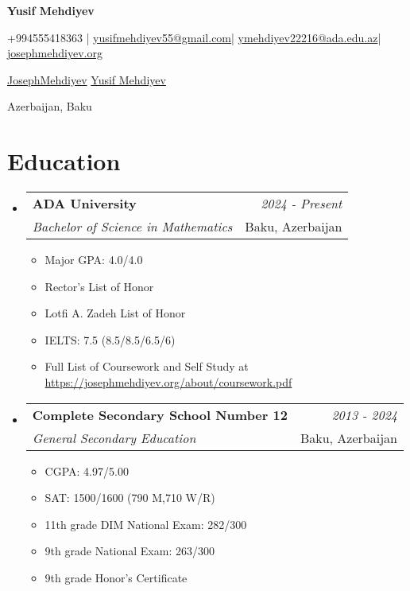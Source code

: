 \documentclass[a4paper,11pt]{article}
\makeatletter
\newcommand{\resumeSubheading}[4]{
    \vspace{0.5mm}
\item
    \begin{tabular*}{0.98\textwidth}[t]{l@{\extracolsep{\fill}}r}
        \textbf{#1} & \textit{\footnotesize{#4}} \\
        \textit{\footnotesize{#3}} &  \footnotesize{#2}\\
    \end{tabular*}
    \vspace{-2.4mm}
}
\newcommand{\resumeSubHeadingListStart}{
\begin{itemize}[leftmargin=*,labelsep=1mm]}
\newcommand{\resumeItemListStart}{
                \begin{itemize}[leftmargin=*,labelsep=1mm,itemsep=0.5mm]}
\newcommand{\resumeSubHeadingListEnd}{
                    \end{itemize}\vspace{2mm}}
\newcommand{\resumeItemListEnd}{
    \end{itemize}\vspace{-2mm}}
\newcommand{\socialicon}[1]{\raisebox{-0.05em}{\resizebox{!}{1em}{#1}}}
\newcommand{\headerfontiii}{\fontfamily{ppl}\selectfont} %
\makeatother
\begin{document}
\headerfontiii

\begin{center}
    {\Huge\textbf{Yusif Mehdiyev}}
\end{center}
\vspace{-5mm}

\begin{center}
    \small{
        +994555418363 | \href{mailto:yusifmehdiyev55@gmail.com}{yusifmehdiyev55@gmail.com}|
        \href{mailto:ymehdiyev22216@ada.edu.az}{ymehdiyev22216@ada.edu.az}|
        \href{https://josephmehdiyev.org/}{josephmehdiyev.org}
    }
\end{center}
\vspace{-5mm}

\begin{center}
    \small{
        \socialicon{\faGithub} \href{https://github.com/JosephMehdiyev}{JosephMehdiyev}
        \socialicon{\faLinkedin} \href{https://www.linkedin.com/in/yusif-mehdiyev-6155982ab/} {Yusif Mehdiyev}
    }
\end{center}
\vspace{-5mm}
\begin{center}
    \small{Azerbaijan, Baku}
\end{center}

\vspace{-4mm}

\vspace{-2mm}

\section{\textbf{Education}}
\vspace{-0.4mm}
\resumeSubHeadingListStart
\resumeSubheading
{ADA University}{Baku, Azerbaijan}
{Bachelor of Science in Mathematics}{2024 - Present}
\resumeItemListStart
\item Major GPA: 4.0/4.0
\item Rector’s List of Honor
\item Lotfi A. Zadeh List of Honor
\item IELTS: 7.5 (8.5/8.5/6.5/6)
\item Full List of Coursework and Self Study at \url{https://josephmehdiyev.org/about/coursework.pdf}

\resumeItemListEnd

\resumeSubheading
{Complete Secondary School Number 12}{Baku, Azerbaijan}
{General Secondary Education}{2013 - 2024}
\resumeItemListStart
\item CGPA: 4.97/5.00
\item SAT: 1500/1600 (790 M,710 W/R)
\item 11th grade DIM National Exam: 282/300
\item 9th grade National Exam: 263/300
\item 9th grade Honor's Certificate
\resumeItemListEnd
\resumeSubHeadingListEnd
\vspace{-6mm}
\end{document}
